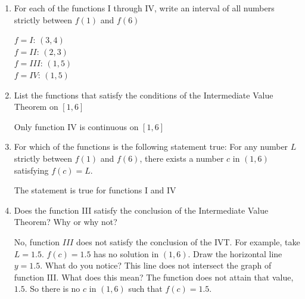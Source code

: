 \documentclass{ximera}
\begin{document}
\begin{problem}
\begin{enumerate}
\begin{enumerate}
	\item For each of the functions I through IV, write an interval of all numbers strictly between $f(1)$ and $f(6)$
\begin{explanation}
		$f=I$: $(3,4)$\\
		$f=II$: $(2,3)$\\
		$f=III$: $(1,5)$\\
		$f=IV$: $(1,5)$
		\end{explanation}
	\item List the functions that satisfy the conditions of the Intermediate Value Theorem on $[1,6]$
\begin{explanation}
		Only function IV is continuous on $[1,6]$
		\end{explanation}
	\item For which of the functions is the following statement true: For any number $L$ strictly between $f(1)$ and $f(6)$, there exists a number $c$ in $(1,6)$ satisfying $f(c)=L$.
\begin{explanation}
		The statement is true for functions I and IV
		\end{explanation}

	\item Does the function III satisfy the conclusion of the Intermediate Value Theorem?  Why or why not?
\begin{explanation}
	No, function $III$ does not satisfy the conclusion of the IVT.  For example, take $L=1.5$.  $f(c)=1.5$ has no solution in $(1,6)$.  Draw the horizontal line $y=1.5$.  What do you notice?  This line does not intersect the graph of function III.  What does this mean?  The function does not attain that value, $1.5$.  So there is no $c$ in $(1,6)$ such that $f(c)=1.5$.
	\end{explanation}


	\end{enumerate}
\end{enumerate}

\end{problem}
\end{document}
